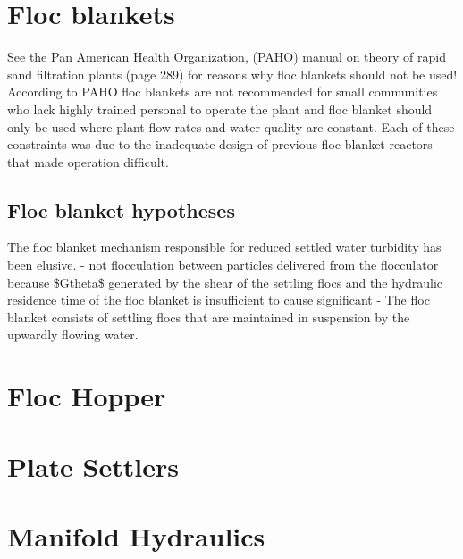 \documentclass[letterpaper,10pt,english]{sphinxmanual}
\begin{document}
\section{Floc blankets}
\label{\detokenize{Sedimentation/Sed_Intro:floc-blankets}}\label{\detokenize{Sedimentation/Sed_Intro:id1}}
See the Pan American Health Organization, (PAHO) manual on theory of rapid sand filtration plants (page 289) for reasons why floc blankets should not be used! According to PAHO floc blankets are not recommended for small communities who lack highly trained personal to operate the plant and floc blanket should only be used where plant flow rates and water quality are constant. Each of these constraints was due to the inadequate design of previous floc blanket reactors that made operation difficult.


\subsection{Floc blanket hypotheses}
\label{\detokenize{Sedimentation/Sed_Intro:floc-blanket-hypotheses}}\label{\detokenize{Sedimentation/Sed_Intro:id2}}
The floc blanket mechanism responsible for reduced settled water turbidity has been elusive.
- not flocculation between particles delivered from the flocculator because \$Gtheta\$ generated by the shear of the settling flocs and the hydraulic residence time of the floc blanket is insufficient to cause significant
- The floc blanket consists of settling flocs that are maintained in suspension by the upwardly flowing water.


\section{Floc Hopper}
\label{\detokenize{Sedimentation/Sed_Intro:floc-hopper}}\label{\detokenize{Sedimentation/Sed_Intro:id3}}

\section{Plate Settlers}
\label{\detokenize{Sedimentation/Sed_Intro:plate-settlers}}\label{\detokenize{Sedimentation/Sed_Intro:id4}}

\section{Manifold Hydraulics}
\label{\detokenize{Sedimentation/Sed_Intro:manifold-hydraulics}}\label{\detokenize{Sedimentation/Sed_Intro:id5}}
\end{document}
